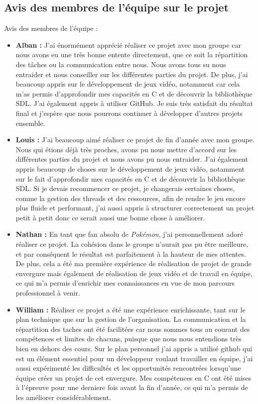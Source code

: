 \documentclass[12pt,a4paper, twoside]{article}
\begin{document}
\subsection{Avis des membres de l'équipe sur le projet}
Avis des membres de l'équipe :
\begin{itemize}
    \item \textbf{Alban :}  J'ai énormément apprécié réaliser ce projet avec mon groupe car nous avons eu une très bonne entente directement, que ce soit la répartition des tâches ou la communication entre nous. Nous avons tous su nous entraider et nous conseiller sur les différentes parties du projet. De plus, j'ai beaucoup appris sur le développement de jeux vidéo, notamment car cela m'as permis d'approfondir mes capacités en C et de découvrir la bibliothèque SDL. J'ai également appris à utiliser GitHub. Je suis très satisfait du résultat final et j'espère que nous pourrons continuer à développer d'autres projets ensemble.
    \newline
    \item \textbf{Louis :} J'ai beaucoup aimé réaliser ce projet de fin d'année avec mon groupe. Nous qui étions déjà très proches, avons pu nous mettre d'accord sur les différentes parties du projet et nous avons pu nous entraider. J'ai également appris beaucoup de choses sur le développement de jeux vidéo, notamment sur le fait d'approfondir mes capacités en C et de découvrir la bibliothèque SDL. Si je devais recommencer ce projet, je changerais certaines choses, comme la gestion des threads et des ressources, afin de rendre le jeu encore plus fluide et performant, j'ai aussi appris à structurer correctement un projet petit à petit donc ce serait aussi une bonne chose à améliorer.
    \newline
    \item \textbf{Nathan :} En tant que fan absolu de \emph{Pokémon}, j'ai personnellement adoré réaliser ce projet. La cohésion dans le groupe n'aurait pas pu être meilleure, et par conséquent le résultat est parfaitement à la hauteur de mes attentes. De plus, cela a été ma première expérience de réalisation de projet de grande envergure mais également de réalisation de jeux vidéo et de travail en équipe, ce qui m'a permis d'enrichir mes connaissances en vue de mon parcours professionnel à venir.
    \newline
    \item \textbf{William :} Réaliser ce projet a été une expérience enrichissante, tant sur le plan technique que sur la gestion de l'organisation. La communication et la répartition des taches ont été facilitées car nous sommes tous au courant des compétences et limites de chacuns, puisque que nous nous entendions très bien en dehors des cours. Sur le plan personnel j'ai appris a utilisé github qui est un élément essentiel pour un développeur voulant travailler en équipe, j'ai aussi expérimenté les difficultés et les opportunités rencontrées lorsqu'une équipe créer un projet de cet envergure. Mes compétences en C ont été mises à l'épreuve pour une derniere fois avant la fin d'année, ce qui m'a permis de les améliorer considérablement.
    
\end{itemize}
\end{document}
